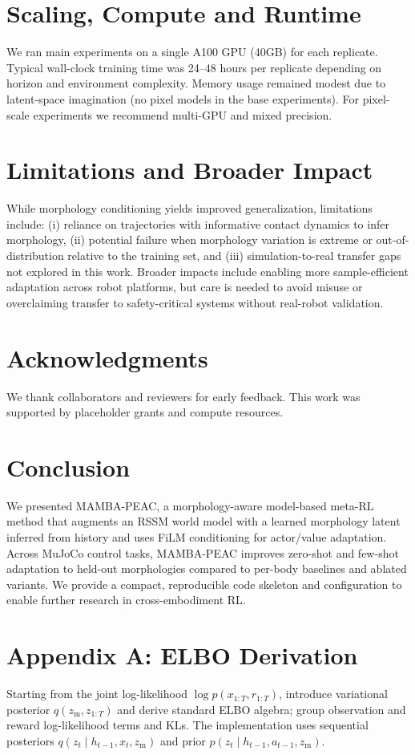 \documentclass{article}
\begin{document}
\section{Scaling, Compute and Runtime}
We ran main experiments on a single A100 GPU (40GB) for each replicate. Typical wall-clock training time was 24--48 hours per replicate depending on horizon and environment complexity. Memory usage remained modest due to latent-space imagination (no pixel models in the base experiments). For pixel-scale experiments we recommend multi-GPU and mixed precision.

\section{Limitations and Broader Impact}
While morphology conditioning yields improved generalization, limitations include: (i) reliance on trajectories with informative contact dynamics to infer morphology, (ii) potential failure when morphology variation is extreme or out-of-distribution relative to the training set, and (iii) simulation-to-real transfer gaps not explored in this work. Broader impacts include enabling more sample-efficient adaptation across robot platforms, but care is needed to avoid misuse or overclaiming transfer to safety-critical systems without real-robot validation.

\section{Acknowledgments}
We thank collaborators and reviewers for early feedback. This work was supported by placeholder grants and compute resources.

\section{Conclusion}
We presented MAMBA-PEAC, a morphology-aware model-based meta-RL method that augments an RSSM world model with a learned morphology latent inferred from history and uses FiLM conditioning for actor/value adaptation. Across MuJoCo control tasks, MAMBA-PEAC improves zero-shot and few-shot adaptation to held-out morphologies compared to per-body baselines and ablated variants. We provide a compact, reproducible code skeleton and configuration to enable further research in cross-embodiment RL.



\appendix
\section{Appendix A: ELBO Derivation}
Starting from the joint log-likelihood $\log p(x_{1:T},r_{1:T})$, introduce variational posterior $q(z_{\mathrm{m}},z_{1:T})$ and derive standard ELBO algebra; group observation and reward log-likelihood terms and KLs. The implementation uses sequential posteriors $q(z_t\mid h_{t-1},x_t,z_{\mathrm{m}})$ and prior $p(z_t\mid h_{t-1},a_{t-1},z_{\mathrm{m}})$.
\end{document}
